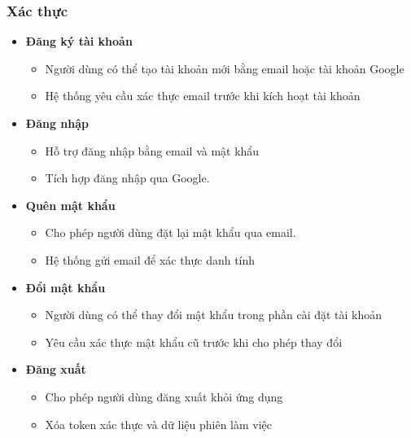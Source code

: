 \subsubsection{Xác thực}
\begin{itemize}
    \item \textbf{Đăng ký tài khoản}
    \begin{itemize}
        \item Người dùng có thể tạo tài khoản mới bằng email hoặc tài khoản Google
        \item Hệ thống yêu cầu xác thực email trước khi kích hoạt tài khoản
    \end{itemize}
    
    \item \textbf{Đăng nhập}
    \begin{itemize}
        \item Hỗ trợ đăng nhập bằng email và mật khẩu
        \item Tích hợp đăng nhập qua Google.
    \end{itemize}
    
    \item \textbf{Quên mật khẩu}
    \begin{itemize}
        \item Cho phép người dùng đặt lại mật khẩu qua email.
        \item Hệ thống gửi email để xác thực danh tính
    \end{itemize}
    
    \item \textbf{Đổi mật khẩu}
    \begin{itemize}
        \item Người dùng có thể thay đổi mật khẩu trong phần cài đặt tài khoản
        \item Yêu cầu xác thực mật khẩu cũ trước khi cho phép thay đổi
    \end{itemize}
    
    \item \textbf{Đăng xuất}
    \begin{itemize}
        \item Cho phép người dùng đăng xuất khỏi ứng dụng
        \item Xóa token xác thực và dữ liệu phiên làm việc
    \end{itemize}
    
\end{itemize}

